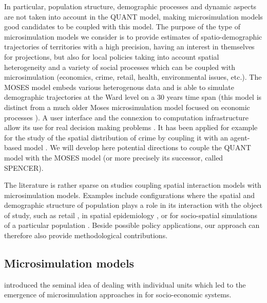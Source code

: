 In particular, population structure, demographic processes and dynamic aspects are not taken into account in the QUANT model, making microsimulation models \cite{birkin2011spatial} good candidates to be coupled with this model. The purpose of the type of microsimulation models we consider is to provide estimates of spatio-demographic trajectories of territories with a high precision, having an interest in themselves for projections, but also for local policies taking into account spatial heterogeneity and a variety of social processes which can be coupled with microsimulation (economics, crime, retail, health, environmental issues, etc.). The MOSES model embeds various heterogenous data and is able to simulate demographic trajectories at the Ward level on a 30 years time span \cite{townend2009moses,Wu2013} (this model is distinct from a much older Moses microsimulation model focused on economic processes \cite{eliasson1989moses}). A user interface and the connexion to computation infrastructure allow its use for real decision making problems \cite{birkin2009moses}. It has been applied for example for the study of the spatial distribution of crime by coupling it with an agent-based model \cite{malleson2012analysis}. We will develop here potential directions to couple the QUANT model with the MOSES model (or more precisely its successor, called SPENCER).

The literature is rather sparse on studies coupling spatial interaction models with microsimulation models. Examples include configurations where the spatial and demographic structure of population plays a role in its interaction with the object of study, such as retail \cite{Nakaya2007}, in spatial epidemiology \cite{morrissey2010examining}, or for socio-spatial simulations of a particular population \cite{wu2008spatial}. Beside possible policy applications, our approach can therefore also provide methodological contributions.


\subsection{Microsimulation models}

\cite{orcutt1957new} introduced the seminal idea of dealing with individual units which led to the emergence of microsimulation approaches in for socio-economic systems.

